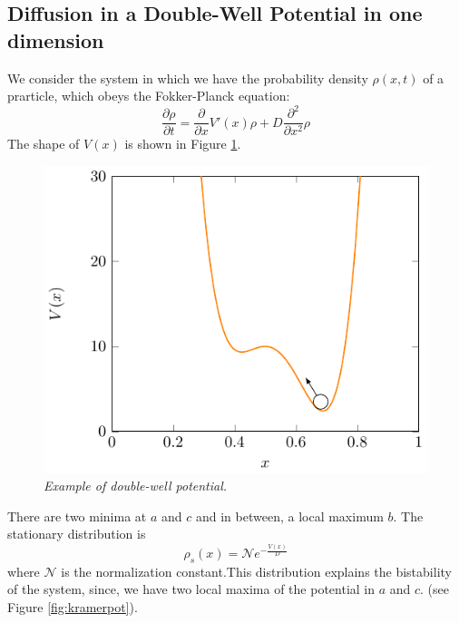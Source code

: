 \subsection{Diffusion in a Double-Well Potential in one dimension}
We consider the system in which we have the probability density $\rho(x,t)$ of a prarticle, which obeys the Fokker-Planck equation:
\begin{equation}
\frac{\partial \rho}{\partial t } = \frac{\partial}{\partial x} V'(x)\rho + D \frac{\partial ^2 }{\partial x^2} \rho
\end{equation}
The shape of $V(x)$ is shown in Figure \ref{fig:kr}.
\begin{figure}[h]
\centering
\includegraphics[scale=1.2]{images/kramerwell.pdf}
\caption{\emph{Example of double-well potential.}}
\label{fig:kr}
\end{figure}

There are two minima at $a$ and $c$ and in between, a local maximum $b$. The stationary distribution is
\begin{equation}
\rho_s(x) = \mathcal{N} e^{-\frac{V(x)}{D}}
\end{equation}
where $\mathcal{N}$ is the normalization constant.This distribution explains the bistability of the system, since, we have two local maxima of the potential in $a$ and $c$. (see Figure \ref{fig:kramerpot}).

